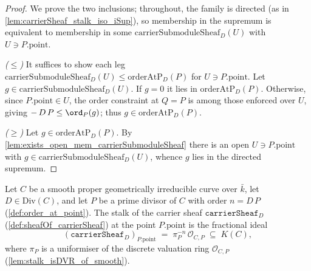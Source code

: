 \begin{proof}
        \leanok
  We prove the two inclusions; throughout, the family is directed (as in
  \cref{lem:carrierSheaf_stalk_iso_iSup}), so membership in the supremum is
  equivalent to membership in some \(\mathrm{carrierSubmoduleSheaf}_D(U)\) with
  \(U \ni P.\mathrm{point}\).

  \emph{(\(\le\))} It suffices to show each leg
  \(\mathrm{carrierSubmoduleSheaf}_D(U) \le \mathrm{orderAtP}_D(P)\) for \(U \ni
  P.\mathrm{point}\). Let \(g \in \mathrm{carrierSubmoduleSheaf}_D(U)\). If
  \(g = 0\) it lies in \(\mathrm{orderAtP}_D(P)\). Otherwise, since
  \(P.\mathrm{point} \in U\), the order constraint at \(Q = P\) is among those
  enforced over \(U\), giving \(-\,D\,P \le \ord_P(g)\); thus
  \(g \in \mathrm{orderAtP}_D(P)\).

  \emph{(\(\ge\))} Let \(g \in \mathrm{orderAtP}_D(P)\). By
  \cref{lem:exists_open_mem_carrierSubmoduleSheaf} there is an open \(U \ni
  P.\mathrm{point}\) with \(g \in \mathrm{carrierSubmoduleSheaf}_D(U)\), whence
  \(g\) lies in the directed supremum.
\end{proof}

\begin{lemma}
  \label{lem:carrierSheaf_stalk_eq_fractionalIdeal}
  Let \(C\) be a smooth proper geometrically irreducible curve over \(\bar k\),
  let \(D \in \mathrm{Div}(C)\), and let \(P\) be a prime divisor of \(C\) with
  order \(n = D\,P\) (\cref{def:order_at_point}). The stalk of the carrier sheaf
  \(\texttt{carrierSheaf}_D\) (\cref{def:sheafOf_carrierSheaf}) at the point
  \(P.\mathrm{point}\) is the fractional ideal
  \[
    (\texttt{carrierSheaf}_D)_{P.\mathrm{point}} \;=\;
    \pi_P^{-n}\,\mathcal O_{C,P} \;\subseteq\; K(C),
  \]
  where \(\pi_P\) is a uniformiser of the discrete valuation ring
  \(\mathcal O_{C,P}\) (\cref{lem:stalk_isDVR_of_smooth}).
\end{lemma}

